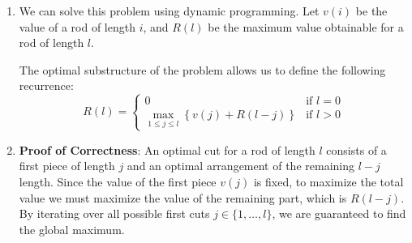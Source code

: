 \documentclass[12pt,a4paper]{report}
\begin{document}
\begin{enumerate}
    \item[(a)] We can solve this problem using dynamic programming. 
    Let $v(i)$ be the value of a rod of length $i$, and $R(l)$ be the maximum value obtainable for a rod of length $l$.
    
    The optimal substructure of the problem allows us to define the following recurrence:
    \[
    R(l) = 
    \begin{cases}
    0 & \text{if } l = 0 \\
    \max_{1 \leq j \leq l} \left\{ v(j) + R(l-j) \right\} & \text{if } l > 0
    \end{cases}
    \]

    \item[(b)] \textbf{Proof of Correctness}: 
    An optimal cut for a rod of length $l$ consists of a first piece of length $j$ and an optimal arrangement of the remaining $l-j$ length. Since the value of the first piece $v(j)$ is fixed, to maximize the total value we must maximize the value of the remaining part, which is $R(l-j)$. By iterating over all possible first cuts $j \in \{1, \dots, l\}$, we are guaranteed to find the global maximum.
\begin{center}
\end{center}
\end{enumerate}
\end{document}
